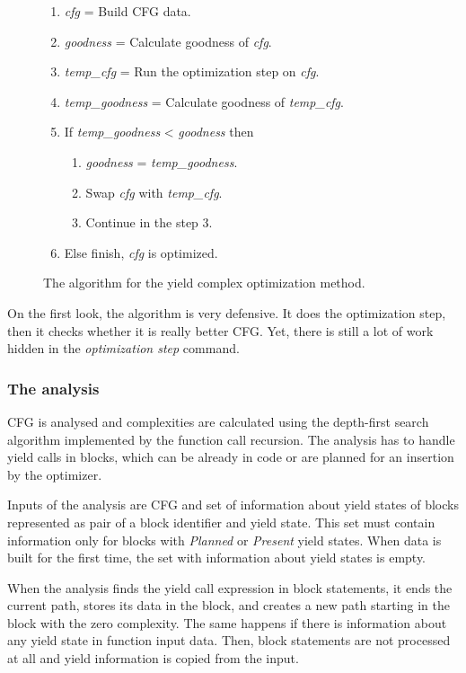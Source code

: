 \begin{figure}[h!]
\caption{The algorithm for the yield complex optimization method.}
\label{yield-algorithm}
\begin{enumerate}
\item{\emph{cfg} = Build CFG data.}
\item{\emph{goodness} = Calculate goodness of \emph{cfg}.}
\item{\emph{temp\_cfg} = Run the optimization step on \emph{cfg}.}
\item{\emph{temp\_goodness} = Calculate goodness of \emph{temp\_cfg}.}
\item{If \emph{temp\_goodness} < \emph{goodness} then}
	\begin{enumerate}[label=5.\arabic*.]
	\item{\emph{goodness} = \emph{temp\_goodness}.}
	\item{Swap \emph{cfg} with \emph{temp\_cfg}.}
	\item{Continue in the step 3.}
	\end{enumerate}
\item{Else finish, \emph{cfg} is optimized.}
\end{enumerate}
\end{figure}

On the first look, the algorithm is very defensive. It does the optimization step, then it checks whether it is really better CFG. Yet, there is still a lot of work hidden in the \emph{optimization step} command.

\subsubsection{The analysis}
CFG is analysed and complexities are calculated using the depth-first search algorithm implemented by the function call recursion. The analysis has to handle yield calls in blocks, which can be already in code or are planned for an insertion by the optimizer.

Inputs of the analysis are CFG and set of information about yield states of blocks represented as pair of a block identifier and yield state. This set must contain information only for blocks with \emph{Planned} or \emph{Present} yield states. When data is built for the first time, the set with information about yield states is empty.

When the analysis finds the yield call expression in block statements, it ends the current path, stores its data in the block, and creates a new path starting in the block with the zero complexity. The same happens if there is information about any yield state in function input data. Then, block statements are not processed at all and yield information is copied from the input.

